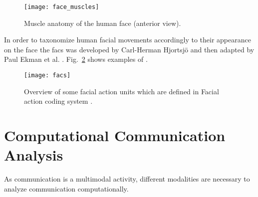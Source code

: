 \begin{figure}
    \centering
    \texttt{[image: face\_muscles]}
    \caption{Muscle anatomy of the human face (anterior view).\cite{Prendergast2013anatomy}}
    \label{fig:facemuscles}
\end{figure}

In order to taxonomize human facial movements accordingly to their appearance on the face the \gls{facs} was developed by Carl-Herman Hjortsj{\"{o}} and then adapted by Paul Ekman et al. \cite{Ekman1977}. Fig.~\ref{fig:facs} shows examples of . 


\begin{figure}
    \centering
    \texttt{[image: facs]}
    \caption{Overview of some facial action units which are defined in Facial action coding system \cite{Ekman1977}.}
    \label{fig:facs}
\end{figure}


\section{Computational Communication Analysis }

As communication is a multimodal activity, different modalities are necessary to analyze communication computationally.


